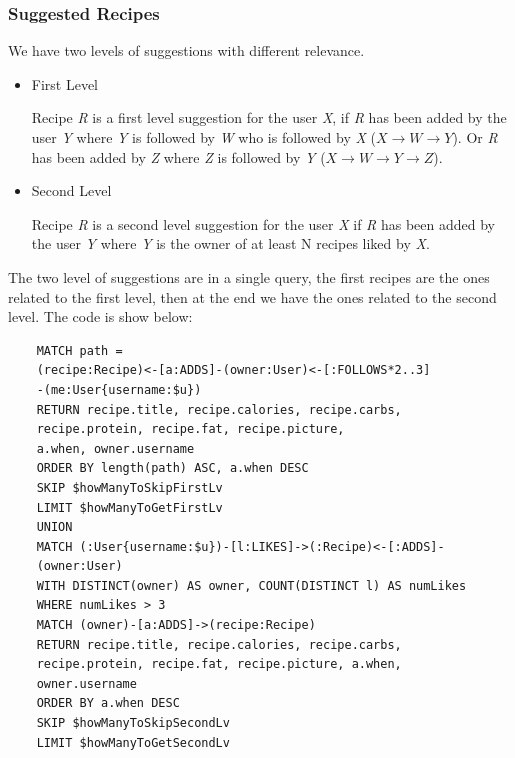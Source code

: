 \documentclass[a4paper]{report}
\begin{document}
\subsubsection{Suggested Recipes}
We have two levels of suggestions with different relevance.
\begin{itemize}
	\item First Level
	
	\noindent Recipe \emph{R} is a first level suggestion for the user \emph{X}, if \emph{R} has been added by the user \emph{Y} where \emph{Y} is followed by \emph{W} who is followed by \emph{X} ($X \rightarrow W \rightarrow Y$). Or \emph{R} has been added by \emph{Z} where \emph{Z} is followed by \emph{Y} ($ X \rightarrow W \rightarrow Y \rightarrow Z$).
	
	\item Second Level
	
	\noindent Recipe \emph{R} is a second level suggestion for the user \emph{X} if \emph{R} has been added by the user \emph{Y} where \emph{Y} is the owner of at least N recipes liked by \emph{X}.
	
\end{itemize}


\noindent The two level of suggestions are in a single query, the first recipes are the ones related to the first level, then at the end we have the ones related to the second level. The code is show below:

\begin{lstlisting}
	MATCH path =
	(recipe:Recipe)<-[a:ADDS]-(owner:User)<-[:FOLLOWS*2..3]
	-(me:User{username:$u})
	RETURN recipe.title, recipe.calories, recipe.carbs,
	recipe.protein, recipe.fat, recipe.picture,
	a.when, owner.username
	ORDER BY length(path) ASC, a.when DESC
	SKIP $howManyToSkipFirstLv
	LIMIT $howManyToGetFirstLv
	UNION
	MATCH (:User{username:$u})-[l:LIKES]->(:Recipe)<-[:ADDS]-
	(owner:User)
	WITH DISTINCT(owner) AS owner, COUNT(DISTINCT l) AS numLikes
	WHERE numLikes > 3
	MATCH (owner)-[a:ADDS]->(recipe:Recipe)
	RETURN recipe.title, recipe.calories, recipe.carbs,
	recipe.protein, recipe.fat, recipe.picture, a.when,
	owner.username
	ORDER BY a.when DESC
	SKIP $howManyToSkipSecondLv
	LIMIT $howManyToGetSecondLv	
\end{lstlisting}
\end{document}

